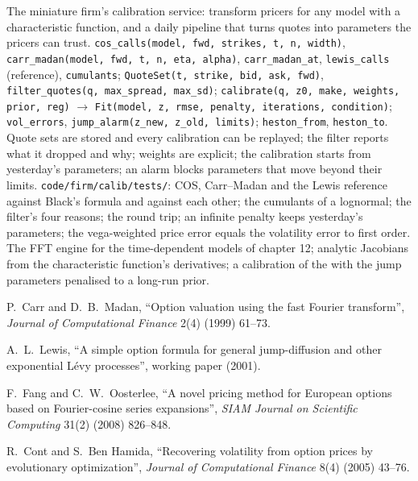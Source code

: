 \begin{build}
 The miniature firm's calibration service: transform pricers for any model with a characteristic function, and a daily
pipeline that turns quotes into parameters the pricers can trust.
 \texttt{cos\_calls(model, fwd, strikes, t, n, width)}, \texttt{carr\_madan(model, fwd, t, n, eta, alpha)},
\texttt{carr\_madan\_at}, \texttt{lewis\_calls} (reference), \texttt{cumulants}; \texttt{QuoteSet(t, strike, bid, ask, fwd)},
\texttt{filter\_quotes(q, max\_spread, max\_sd)}; \texttt{calibrate(q, z0, make, weights, prior, reg)} $\to$ \texttt{Fit(model, z, rmse,
penalty, iterations, condition)}; \texttt{vol\_errors}, \texttt{jump\_alarm(z\_new, z\_old, limits)}; \texttt{heston\_from}, \texttt{heston\_to}.
 Quote sets are stored and every calibration can be replayed; the filter reports what it dropped and why; weights are explicit;
the calibration starts from yesterday's parameters; an alarm blocks parameters that move beyond their limits.
 \texttt{code/firm/calib/tests/}: COS, Carr--Madan and the Lewis reference against Black's formula and against each other;
the cumulants of a lognormal; the filter's four reasons; the round trip; an infinite penalty keeps yesterday's parameters; the vega-weighted
price error equals the volatility error to first order.
 The FFT engine for the time-dependent models of chapter 12; analytic Jacobians from the characteristic function's derivatives;
a calibration of the  with the jump parameters penalised to a long-run prior.
\end{build}

\begin{omsources}
\item P.~Carr and D.~B.~Madan, ``Option valuation using the fast Fourier transform'', \emph{Journal of Computational Finance} 2(4) (1999) 61--73.
\item A.~L.~Lewis, ``A simple option formula for general jump-diffusion and other exponential L\'evy processes'', working paper (2001).
\item F.~Fang and C.~W.~Oosterlee, ``A novel pricing method for European options based on Fourier-cosine series expansions'', \emph{SIAM Journal on
Scientific Computing} 31(2) (2008) 826--848.
\item R.~Cont and S.~Ben Hamida, ``Recovering volatility from option prices by evolutionary optimization'', \emph{Journal of Computational Finance}
8(4) (2005) 43--76.
\end{omsources}

